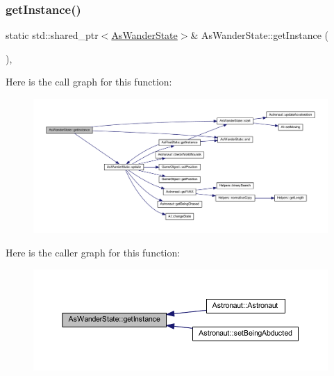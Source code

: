 \subsubsection{\texorpdfstring{get\+Instance()}{getInstance()}}
{\footnotesize\ttfamily static std\+::shared\+\_\+ptr$<$\hyperlink{class_as_wander_state}{As\+Wander\+State}$>$\& As\+Wander\+State\+::get\+Instance (\begin{DoxyParamCaption}{ }\end{DoxyParamCaption})\hspace{0.3cm}{\ttfamily [inline]}, {\ttfamily [static]}}

Here is the call graph for this function\+:
\nopagebreak
\begin{figure}[H]
\begin{center}
\leavevmode
\includegraphics[width=350pt]{class_as_wander_state_aec2c7973e9d2e7c3087a1a5c486a2bc4_cgraph}
\end{center}
\end{figure}
Here is the caller graph for this function\+:
\nopagebreak
\begin{figure}[H]
\begin{center}
\leavevmode
\includegraphics[width=350pt]{class_as_wander_state_aec2c7973e9d2e7c3087a1a5c486a2bc4_icgraph}
\end{center}
\end{figure}
\mbox{\label{class_as_wander_state_a7821ce2fdac9afa1b111f695ac51af43}} 
